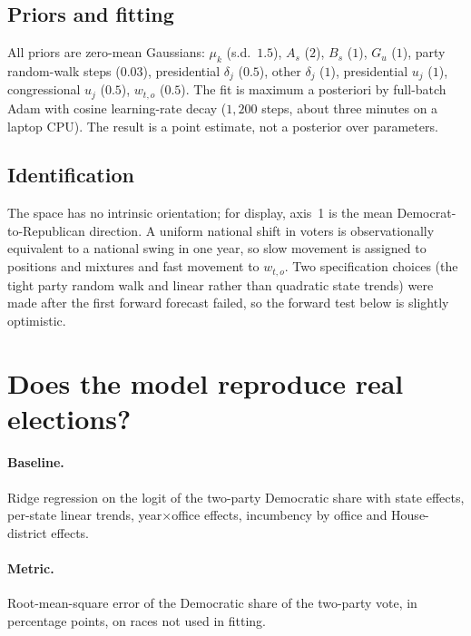 \documentclass[11pt]{article}
\begin{document}
\FloatBarrier
\subsection{Priors and fitting}
All priors are zero-mean Gaussians: $\mu_k$ (s.d.\ $1.5$), $A_s$ ($2$), $B_s$ ($1$), $G_u$ ($1$), party random-walk steps ($0.03$), presidential $\delta_j$ ($0.5$), other $\delta_j$ ($1$), presidential $u_j$ ($1$), congressional $u_j$ ($0.5$), $w_{t,o}$ ($0.5$). The fit is maximum a posteriori by full-batch Adam with cosine learning-rate decay ($1{,}200$ steps, about three minutes on a laptop CPU). The result is a point estimate, not a posterior over parameters.

\FloatBarrier
\subsection{Identification}
The space has no intrinsic orientation; for display, axis~1 is the mean Democrat-to-Republican direction. A uniform national shift in voters is observationally equivalent to a national swing in one year, so slow movement is assigned to positions and mixtures and fast movement to $w_{t,o}$. Two specification choices (the tight party random walk and linear rather than quadratic state trends) were made after the first forward forecast failed, so the forward test below is slightly optimistic.

\section{Does the model reproduce real elections?}
\label{sec:validation}

\paragraph{Baseline.} Ridge regression on the logit of the two-party Democratic share with state effects, per-state linear trends, year$\times$office effects, incumbency by office and House-district effects.

\paragraph{Metric.} Root-mean-square error of the Democratic share of the two-party vote, in percentage points, on races not used in fitting.
\end{document}
